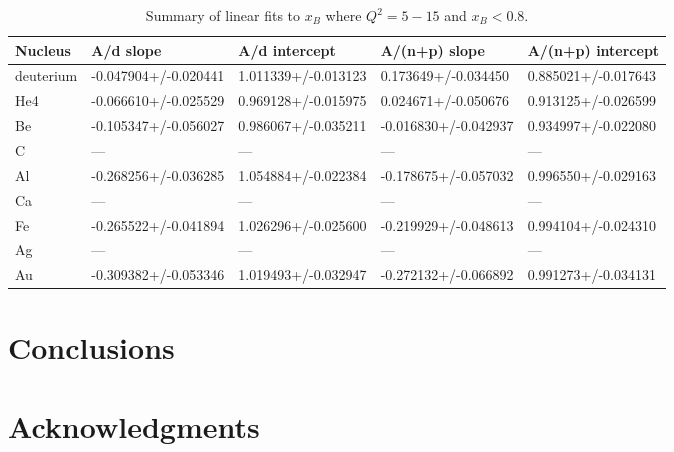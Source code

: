 \documentclass[oneside]{article}
\begin{document}
\begin{table}[htb!]
\caption{\label{SlopeFits2} Summary of linear fits to $x_B$ where $Q^2=5-15$ and $x_B<0.8$.}
\centering
\begin{tabular}{ | C{2.5cm} | C{2cm} | C{2cm} | C{2cm} | C{2cm} | }
 \hline
 \textbf{Nucleus} & \textbf{A/d slope} & \textbf{A/d intercept} & \textbf{A/(n+p) slope} & \textbf{A/(n+p) intercept} \\ 
  \hline
deuterium & -0.047904+/-0.020441	&1.011339+/-0.013123& 0.173649+/-0.034450	&0.885021+/-0.017643 \\ 
  \hline
  He4 &-0.066610+/-0.025529&	0.969128+/-0.015975 & 0.024671+/-0.050676&	0.913125+/-0.026599 \\ 
 \hline
 Be &-0.105347+/-0.056027&	0.986067+/-0.035211 &-0.016830+/-0.042937&	0.934997+/-0.022080\\ 
  \hline
   C &---&--- & ---	&--- \\ 
  \hline
    Al &-0.268256+/-0.036285	&1.054884+/-0.022384&-0.178675+/-0.057032&	0.996550+/-0.029163 \\ 
  \hline
 Ca &---&--- & ---	&--- \\ 
  \hline  
  Fe &-0.265522+/-0.041894	&1.026296+/-0.025600&-0.219929+/-0.048613	&0.994104+/-0.024310\\ 
  \hline 
  Ag &---&--- & ---	&---  \\ 
  \hline 
   Au & -0.309382+/-0.053346 &	1.019493+/-0.032947 & -0.272132+/-0.066892 &	0.991273+/-0.034131\\ 
  \hline 
    \end{tabular}
\end{table} 


\section{Conclusions}

\section{Acknowledgments}
\end{document}
